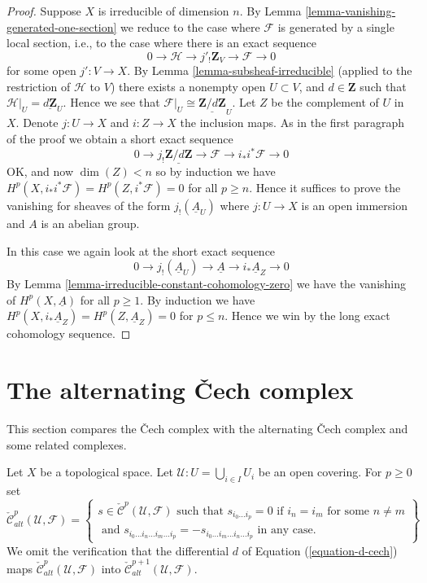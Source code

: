 \begin{proof}
\medskip\noindent
Suppose $X$ is irreducible of dimension $n$.
By Lemma \ref{lemma-vanishing-generated-one-section}
we reduce to the case where $\mathcal{F}$
is generated by a single local section, i.e., to the case
where there is an exact sequence
$$
0 \to \mathcal{H} \to j'_!{\mathbf{Z}}_V \to \mathcal{F} \to 0
$$
for some open $j' : V \to X$. By Lemma \ref{lemma-subsheaf-irreducible}
(applied to the restriction of $\mathcal{H}$ to $V$) there exists a
nonempty open $U \subset V$, and $d \in \mathbf{Z}$ such that
$\mathcal{H}|_U = \underline{d\mathbf{Z}}_U$. Hence we see that
$\mathcal{F}|_U \cong \underline{\mathbf{Z}/d\mathbf{Z}}_U$.
Let $Z$ be the complement of $U$ in $X$.
Denote $j : U \to X$ and $i : Z \to X$ the inclusion maps.
As in the first paragraph of the proof we obtain a short exact
sequence
$$
0 \to j_{!}\underline{\mathbf{Z}/d\mathbf{Z}}
\to \mathcal{F}
\to i_*i^*\mathcal{F} \to 0
$$
OK, and now $\dim(Z) < n$ so by induction we have
$H^p(X, i_*i^*\mathcal{F}) = H^p(Z, i^*\mathcal{F}) = 0$
for all $p \geq n$. Hence it suffices to prove the vanishing
for sheaves of the form $j_!(\underline{A}_U)$ where
$j : U \to X$ is an open immersion and $A$ is an abelian group.

\medskip\noindent
In this case we again look at the short exact sequence
$$
0 \to j_!(\underline{A}_U) \to \underline{A} \to i_*\underline{A}_Z \to 0
$$
By Lemma \ref{lemma-irreducible-constant-cohomology-zero}
we have the vanishing of $H^p(X, \underline{A})$
for all $p \geq 1$. By induction we have
$H^p(X, i_*\underline{A}_Z) = H^p(Z, \underline{A}_Z) = 0$
for $p \leq n$. Hence we win by the long exact cohomology sequence.
\end{proof}












\section{The alternating {\v C}ech complex}
\label{section-alternating-cech}

\noindent
This section compares the {\v C}ech complex with the alternating {\v C}ech
complex and some related complexes.

\medskip\noindent
Let $X$ be a topological space. Let $\mathcal{U} : U = \bigcup_{i \in I} U_i$
be an open covering. For $p \geq 0$ set
$$
\check{\mathcal{C}}_{alt}^p(\mathcal{U}, \mathcal{F})
=
\left\{
\begin{matrix}
s \in  \check{\mathcal{C}}^p(\mathcal{U}, \mathcal{F})
\text{ such that }
s_{i_0 \ldots i_p} = 0 \text{ if } i_n = i_m \text{ for some } n \not = m\\
\text{ and }
s_{i_0\ldots i_n \ldots i_m \ldots i_p}
=
-s_{i_0\ldots i_m \ldots i_n \ldots i_p}
\text{ in any case.}
\end{matrix}
\right\}
$$
We omit the verification that the differential $d$ of
Equation (\ref{equation-d-cech}) maps
$\check{\mathcal{C}}^p_{alt}(\mathcal{U}, \mathcal{F})$ into
$\check{\mathcal{C}}^{p + 1}_{alt}(\mathcal{U}, \mathcal{F})$.

